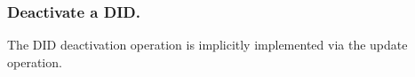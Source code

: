 \subsubsection{Deactivate a DID.} %
The DID deactivation operation is implicitly implemented via the update
operation. 

